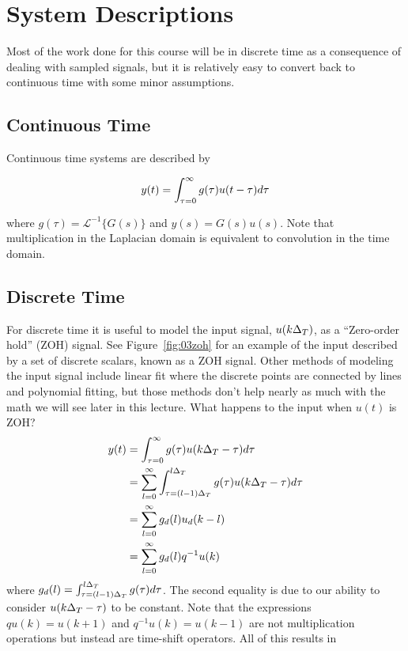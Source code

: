 \mainmatter%
\setcounter{page}{1}

\lectureseries[\course]{\course}

\date{October 1, 2009}

\setaddress%

\setcounter{lecture}{2}
\setcounter{chapter}{2}


\section{System Descriptions}
Most of the work done for this course will be in discrete time as a consequence of dealing with sampled signals, but it is relatively easy to convert back to continuous time with some minor assumptions.

\subsection{Continuous Time}
Continuous time systems are described by

\begin{equation*}
y(t) = \int_{\tau=0}^\infty g(\tau)u(t-\tau)d\tau
\end{equation*}

where $g(\tau)=\mathcal{L}^{-1}\lbrace G(s)\rbrace$ and $y(s)=G(s)u(s)$.
Note that multiplication in the Laplacian domain is equivalent to convolution in the time domain.

\subsection{Discrete Time}
For discrete time it is useful to model the input signal, $u(k\Delta_T)$, as a ``Zero-order hold'' (ZOH) signal.
See Figure~\ref{fig:03zoh} for an example of the input described by a set of discrete scalars, known as a ZOH signal.
Other methods of modeling the input signal include linear fit where the discrete points are connected by lines and polynomial fitting, but those methods don't help nearly as much with the math we will see later in this lecture.
What happens to the input when $u(t)$ is ZOH\@?
\begin{align*}
y(t) &= \int_{\tau=0}^\infty g(\tau)u(k\Delta_T -\tau)d\tau \\
&= \sum_{l=0}^\infty \int_{\tau=(l-1)\Delta_T}^{l\Delta_T}g(\tau)u(k\Delta_T -\tau)d\tau \\
&= \sum_{l=0}^\infty g_d(l)u_d(k-l) \\
&= \sum_{l=0}^\infty g_d(l)q^{-1}u(k)
\end{align*}
where $g_d(l)=\int_{\tau=(l-1)\Delta_T}^{l\Delta_T}g(\tau)d\tau$.
The second equality is due to our ability to consider $u(k\Delta_T -\tau)$ to be constant.
Note that the expressions $qu(k) = u(k+1)$ and $q^{-1}u(k)=u(k-1)$ are not multiplication operations but instead are time-shift operators.
All of this results in

